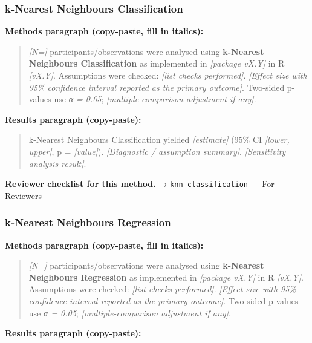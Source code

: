 \documentclass[
]{article}
\begin{document}
\subsubsection{k-Nearest Neighbours
Classification}\label{k-nearest-neighbours-classification}

\textbf{Methods paragraph (copy-paste, fill in italics):}

\begin{quote}
\emph{{[}N={]}} participants/observations were analysed using
\textbf{k-Nearest Neighbours Classification} as implemented in
\emph{{[}package vX.Y{]}} in R \emph{{[}vX.Y{]}}. Assumptions were
checked: \emph{{[}list checks performed{]}}. \emph{{[}Effect size with
95\% confidence interval reported as the primary outcome{]}}. Two-sided
p-values use \emph{α = 0.05}; \emph{{[}multiple-comparison adjustment if
any{]}}.
\end{quote}

\textbf{Results paragraph (copy-paste):}

\begin{quote}
k-Nearest Neighbours Classification yielded \emph{{[}estimate{]}} (95\%
CI \emph{{[}lower, upper{]}}, p = \emph{{[}value{]}}).
\emph{{[}Diagnostic / assumption summary{]}}. \emph{{[}Sensitivity
analysis result{]}}.
\end{quote}

\textbf{Reviewer checklist for this method.} →
\href{../chapters/13-ml/knn-classification.Rmd\#for-reviewers}{\texttt{knn-classification}
--- For Reviewers}

\subsubsection{k-Nearest Neighbours
Regression}\label{k-nearest-neighbours-regression}

\textbf{Methods paragraph (copy-paste, fill in italics):}

\begin{quote}
\emph{{[}N={]}} participants/observations were analysed using
\textbf{k-Nearest Neighbours Regression} as implemented in
\emph{{[}package vX.Y{]}} in R \emph{{[}vX.Y{]}}. Assumptions were
checked: \emph{{[}list checks performed{]}}. \emph{{[}Effect size with
95\% confidence interval reported as the primary outcome{]}}. Two-sided
p-values use \emph{α = 0.05}; \emph{{[}multiple-comparison adjustment if
any{]}}.
\end{quote}

\textbf{Results paragraph (copy-paste):}
\end{document}
